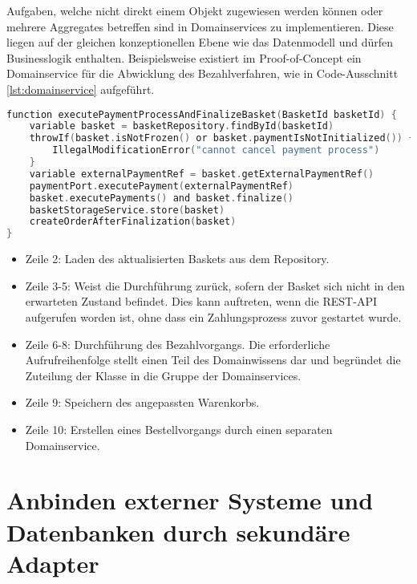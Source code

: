 Aufgaben, welche nicht direkt einem Objekt zugewiesen werden können oder mehrere Aggregates betreffen sind in Domainservices zu implementieren. Diese liegen auf der gleichen konzeptionellen Ebene wie das Datenmodell und dürfen Businesslogik enthalten. Beispielsweise existiert im Proof-of-Concept ein Domainservice für die Abwicklung des Bezahlverfahren, wie in Code-Ausschnitt \ref{lst:domainservice} aufgeführt. 


\begin{minipage}{\linewidth} %
	\begin{lstlisting}[caption={Ausführung des Bezahlvorgangs in einem Domainservice}, label={lst:domainservice}, language=Kotlin]
function executePaymentProcessAndFinalizeBasket(BasketId basketId) {
	variable basket = basketRepository.findById(basketId)
	throwIf(basket.isNotFrozen() or basket.paymentIsNotInitialized()) {
		IllegalModificationError("cannot cancel payment process")
	}
	variable externalPaymentRef = basket.getExternalPaymentRef()
	paymentPort.executePayment(externalPaymentRef)
	basket.executePayments() and basket.finalize()
	basketStorageService.store(basket)
	createOrderAfterFinalization(basket)
}
	\end{lstlisting}
\end{minipage}

\begin{itemize}[noitemsep,nolistsep]
	\item Zeile 2: Laden des aktualisierten Baskets aus dem Repository.
	\item Zeile 3-5: Weist die Durchführung zurück, sofern der Basket sich nicht in den erwarteten Zustand befindet. Dies kann auftreten, wenn die REST-API aufgerufen worden ist, ohne dass ein Zahlungsprozess zuvor gestartet wurde.
	\item Zeile 6-8: Durchführung des Bezahlvorgangs. Die erforderliche Aufrufreihenfolge stellt einen Teil des Domainwissens dar und begründet die Zuteilung der Klasse in die Gruppe der Domainservices.
	\item Zeile 9: Speichern des angepassten Warenkorbs.
	\item Zeile 10: Erstellen eines Bestellvorgangs durch einen separaten Domainservice.
\end{itemize}

\section{Anbinden externer Systeme und Datenbanken durch sekundäre Adapter}

